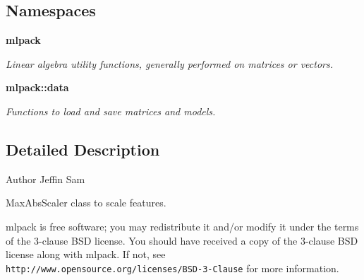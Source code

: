 \subsection*{Namespaces}
\begin{DoxyCompactItemize}
\item 
 \textbf{ mlpack}
\begin{DoxyCompactList}\small\item\em Linear algebra utility functions, generally performed on matrices or vectors. \end{DoxyCompactList}\item 
 \textbf{ mlpack\+::data}
\begin{DoxyCompactList}\small\item\em Functions to load and save matrices and models. \end{DoxyCompactList}\end{DoxyCompactItemize}


\subsection{Detailed Description}
\begin{DoxyAuthor}{Author}
Jeffin Sam
\end{DoxyAuthor}
Max\+Abs\+Scaler class to scale features.

mlpack is free software; you may redistribute it and/or modify it under the terms of the 3-\/clause B\+SD license. You should have received a copy of the 3-\/clause B\+SD license along with mlpack. If not, see {\tt http\+://www.\+opensource.\+org/licenses/\+B\+S\+D-\/3-\/\+Clause} for more information. 